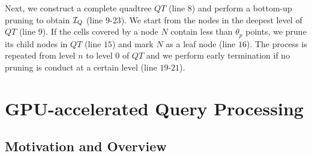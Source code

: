 \documentclass[10pt,conference,letterpaper]{IEEEtran}
\newcommand{\frname}{GAT\xspace }
\newcommand{\idxname}{GTIDX\xspace }
\newcommand{\trajtable}{{\cal S}\xspace}
\newcommand{\treeindex}{{{\cal I}_Q}\xspace}
\begin{document}

Next, we construct a complete quadtree $QT$ (line $8$) and perform a bottom-up pruning to obtain $\treeindex$ (line $9$-$23$). We start from the nodes in the deepest level of $QT$ (line $9$). If the cells covered by a node $N$ contain less than $\theta_p$ points, we prune its child nodes in $QT$ (line $15$) and mark $N$ as a leaf node (line $16$). The process is repeated from level $n$ to level $0$ of $QT$ and we perform early termination if no pruning is conduct at a certain level (line $19$-$21$).




\section{GPU-accelerated Query Processing}\label{sec:query}


\subsection{Motivation and Overview}
\end{document}
